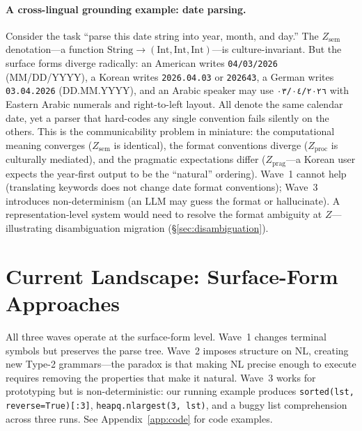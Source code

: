 \documentclass{article}
\theoremstyle{definition}
\newcommand{\Zsem}{Z_{\text{sem}}}
\newcommand{\Zproc}{Z_{\text{proc}}}
\newcommand{\Zprag}{Z_{\text{prag}}}
\begin{document}
\paragraph{A cross-lingual grounding example: date parsing.}
Consider the task ``parse this date string into year, month, and day.'' The $\Zsem$ denotation---a function $\text{String} \to (\text{Int}, \text{Int}, \text{Int})$---is culture-invariant. But the surface forms diverge radically: an American writes \texttt{04/03/2026} (MM/DD/YYYY), a Korean writes \texttt{2026.04.03} or \texttt{202643}, a German writes \texttt{03.04.2026} (DD.MM.YYYY), and an Arabic speaker may use \texttt{٠٣/٠٤/٢٠٢٦} with Eastern Arabic numerals and right-to-left layout. All denote the same calendar date, yet a parser that hard-codes any single convention fails silently on the others. This is the communicability problem in miniature: the computational meaning converges ($\Zsem$ is identical), the format conventions diverge ($\Zproc$ is culturally mediated), and the pragmatic expectations differ ($\Zprag$---a Korean user expects the year-first output to be the ``natural'' ordering). Wave~1 cannot help (translating keywords does not change date format conventions); Wave~3 introduces non-determinism (an LLM may guess the format or hallucinate). A representation-level system would need to resolve the format ambiguity at $Z$---illustrating disambiguation migration (\S\ref{sec:disambiguation}).


\section{Current Landscape: Surface-Form Approaches}\label{sec:landscape}

All three waves operate at the surface-form level. Wave~1 changes terminal symbols but preserves the parse tree. Wave~2 imposes structure on NL, creating new Type-2 grammars---the paradox is that making NL precise enough to execute requires removing the properties that make it natural. Wave~3 works for prototyping but is non-deterministic: our running example produces \texttt{sorted(lst, reverse=True)[:3]}, \texttt{heapq.nlargest(3, lst)}, and a buggy list comprehension across three runs. See Appendix~\ref{app:code} for code examples.
\end{document}
